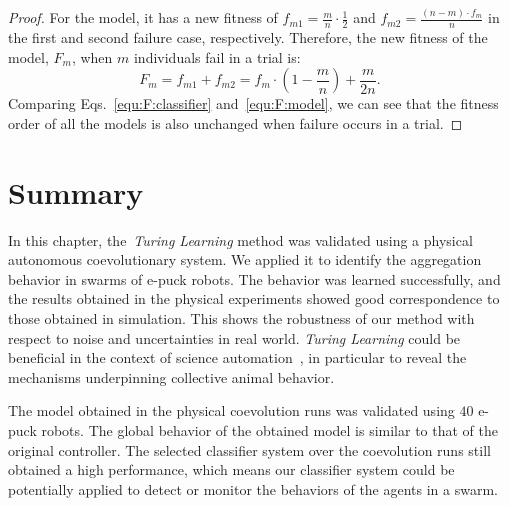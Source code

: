 \begin{proof}
For the model, it has a new fitness of $f_{m1} = \frac{m}{n} \cdot \frac{1}{2}$ and $f_{m2} = \frac{(n-m) \cdot f_m}{n}$ in the first and second failure case, respectively. Therefore, the new fitness of the model, $F_m$, when $m$ individuals fail in a trial is:
\begin{equation}\label{equ:F:model}
{F_m} = f_{m1} + f_{m2} = f_m \cdot (1-\frac{m}{n}) + \frac{m}{2n}.
\end{equation}
Comparing Eqs.~\eqref{equ:F:classifier} and~\eqref{equ:F:model}, we can see that the fitness order of all the models is also unchanged when failure occurs in a trial.
\end{proof}

\section{Summary}\label{sec:summary_swarm_physical}


In this chapter, the~\textit{Turing Learning} method was validated using a physical autonomous coevolutionary system. We applied it to identify the aggregation behavior in swarms of e-puck robots. The behavior was learned successfully, and the results obtained in the physical experiments showed good correspondence to those obtained in simulation. This shows the robustness of our method with respect to noise and uncertainties in real world. \textit{Turing Learning} could be beneficial in the context of science automation~\cite{King2009, Schmidt2009}, in particular to reveal the mechanisms underpinning collective animal behavior.

The model obtained in the physical coevolution runs was validated using $40$ e-puck robots. The global behavior of the obtained model is similar to that of the original controller. The selected classifier system over the coevolution runs still obtained a high performance, which means our classifier system could be potentially applied to detect or monitor the behaviors of the agents in a swarm. 

